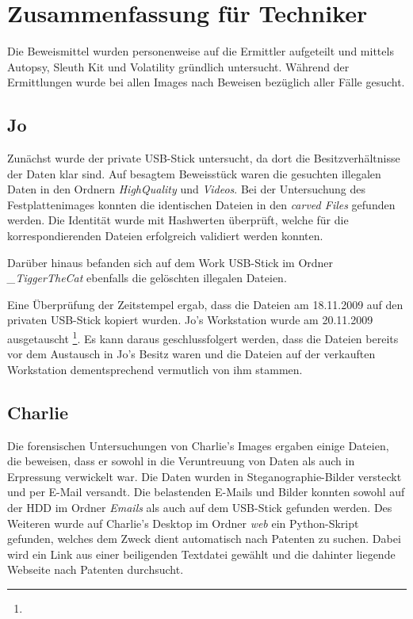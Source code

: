 \chapter{Zusammenfassung für Techniker}
\label{sec:tec}




Die Beweismittel wurden personenweise auf die Ermittler aufgeteilt und mittels Autopsy, Sleuth Kit und Volatility gründlich untersucht. Während der Ermittlungen wurde bei allen Images nach Beweisen bezüglich aller Fälle gesucht.

\section{Jo}
\label{sec:jo}
Zunächst wurde der private USB-Stick untersucht, da dort die Besitzverhältnisse der Daten klar sind. Auf besagtem Beweisstück waren die gesuchten illegalen Daten in den Ordnern \textit{HighQuality} und \textit{Videos}. Bei der Untersuchung des Festplattenimages konnten die identischen Dateien in den \textit{carved Files} gefunden werden. Die Identität wurde mit Hashwerten überprüft, welche für die korrespondierenden Dateien erfolgreich validiert werden konnten.

Darüber hinaus befanden sich auf dem Work USB-Stick im Ordner \textit{_TiggerTheCat} ebenfalls die gelöschten illegalen Dateien.

Eine Überprüfung der Zeitstempel ergab, dass die Dateien am 18.11.2009 auf den privaten USB-Stick kopiert
wurden. Jo's Workstation wurde am 20.11.2009 ausgetauscht \footnote{}. Es kann daraus geschlussfolgert werden, dass die Dateien bereits vor dem Austausch in Jo's Besitz waren und die Dateien auf der verkauften Workstation  dementsprechend vermutlich von ihm stammen.

\section{Charlie}
\label{sec:charlie}
Die forensischen Untersuchungen von Charlie's Images ergaben einige Dateien, die beweisen, dass er sowohl in die Veruntreuung von Daten als auch in Erpressung verwickelt war. Die Daten wurden in Steganographie-Bilder versteckt und per E-Mail versandt. Die belastenden E-Mails und Bilder konnten sowohl auf der HDD im Ordner \textit{Emails} als auch auf dem USB-Stick gefunden werden. Des Weiteren wurde auf Charlie's Desktop im Ordner \textit{web} ein Python-Skript gefunden, welches dem Zweck dient automatisch nach Patenten zu suchen. Dabei wird ein Link aus einer beiligenden Textdatei gewählt und die dahinter liegende Webseite nach Patenten durchsucht.

